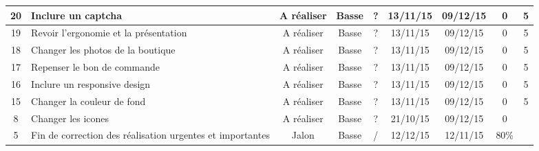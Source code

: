 \begin{tabular}{ | c | p{4cm} | c | c | c | c | c | c | c |  }
20 & Inclure un captcha & A réaliser & Basse & ? & 13/11/15 &
	09/12/15 & 0 & 5 \\ \hline
19 & Revoir l'ergonomie et la présentation & A réaliser & Basse & ? & 13/11/15
	& 09/12/15 & 0 & 5 \\ \hline
18 & Changer les photos de la boutique & A réaliser & Basse & ? & 13/11/15 &
	09/12/15 & 0 & 5 \\ \hline
17 & Repenser le bon de commande & A réaliser & Basse & ? & 13/11/15 & 09/12/15
	& 0 & 5 \\ \hline
16 & Inclure un responsive design & A réaliser & Basse & ? &
	13/11/15 & 09/12/15 & 0 & 5 \\ \hline
15 & Changer la couleur de fond & A réaliser & Basse & ? & 13/11/15 & 09/12/15
	& 0 & 5  \\ \hline
8 & Changer les icones & A réaliser & Basse & ? & 21/10/15 & 09/12/15 & 0 & \\
\hline

5 & Fin de correction des réalisation urgentes et importantes & Jalon & Basse &
	/ & 12/12/15 & 12/11/15 & 80\% & \\ \hline
 \end{tabular}